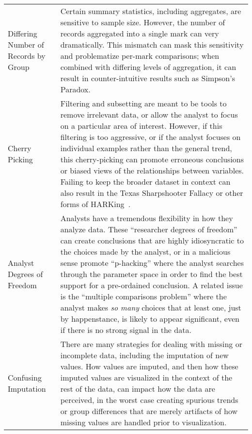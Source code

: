 \begin{table*}[ht!]
\begin{tabular}{>{\raggedright\arraybackslash}p{1.8cm}p{14.7cm}}
   \rowcolor{colorb}\multirow{4}{0em}{\hspace{-0.6cm}\rotatebox{90}{\normalsize{Wrangling}}}Differing Number  of Records by  Group  & Certain summary statistics, including aggregates, are sensitive to sample size. However, the number of records aggregated into a single mark can very dramatically. This mismatch can mask this sensitivity and problematize per-mark comparisons; when combined with differing levels of aggregation, it can result in counter-intuitive results such as Simpson's Paradox. \cite{guo2017you}\\
 \rowcolor{colorb-opaque}Cherry Picking  & Filtering and subsetting are meant to be tools to remove irrelevant data, or allow the analyst to focus on a particular area of interest. However, if this filtering is too aggressive, or if the analyst focuses on individual examples rather than the general trend, this cherry-picking can promote erroneous conclusions or biased views of the relationships between variables. Failing to keep the broader dataset in context can also result in the Texas Sharpshooter Fallacy or other forms of HARKing~\cite{cockburn2018hark}. \cite{few2019loom}\\
 \rowcolor{colorb}Analyst Degrees of Freedom  & Analysts have a tremendous flexibility in how they analyze data. These ``researcher degrees of freedom''~\cite{gelman2013garden} can create conclusions that are highly idiosyncratic to the choices made by the analyst, or in a malicious sense promote ``p-hacking'' where the analyst searches through the parameter space in order to find the best support for a pre-ordained conclusion. A related issue is the ``multiple comparisons problem'' where the analyst makes \emph{so many} choices that at least one, just by happenstance, is likely to appear significant, even if there is no strong signal in the data. \cite{gelman2013garden,pu2018garden,zgraggen2018investigating}\\
 \rowcolor{colorb-opaque}Confusing Imputation  & There are many strategies for dealing with missing or incomplete data, including the imputation of new values. How values are imputed, and then how these imputed values are visualized in the context of the rest of the data, can impact how the data are perceived, in the worst case creating spurious trends or group differences that are merely artifacts of how missing values are handled prior to visualization. \cite{song2018s}\\


\end{tabular}
\end{table*}

